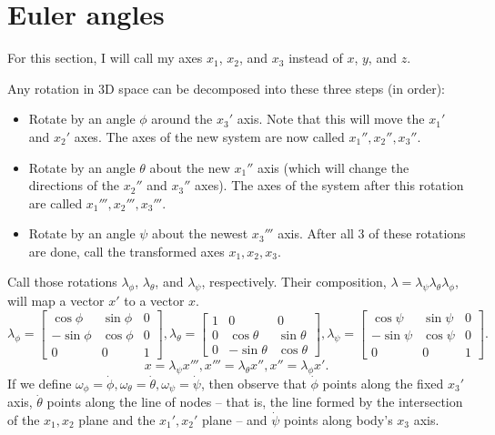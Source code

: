 \documentclass{article}
\begin{document}
\section{Euler angles}
For this section, I will call my axes $x_1$, $x_2$, and $x_3$ instead of $x$, $y$, and $z$.
\par
Any rotation in 3D space can be decomposed into these three steps (in order):
\begin{itemize}
    \item Rotate by an angle $\phi$ around the $x_3'$ axis. Note that this will move the $x_1'$ and $x_2'$ axes. The axes of the new system are now called $x_1'', x_2'', x_3''$.
    \item Rotate by an angle $\theta$ about the new $x_1''$ axis (which will change the directions of the $x_2''$ and $x_3''$ axes). The axes of the system after this rotation are called $x_1''', x_2''', x_3'''$.
    \item Rotate by an angle $\psi$ about the newest $x_3'''$ axis. After all 3 of these rotations are done, call the transformed axes $x_1, x_2, x_3$.
\end{itemize}
Call those rotations $\lambda_\phi$, $\lambda_\theta$, and $\lambda_\psi$, respectively. Their composition, $\lambda=\lambda_\psi \lambda_\theta \lambda_\phi$, will map a vector $x'$ to a vector $x$.
\[ \lambda_\phi = \begin{bmatrix}
    \cos \phi & \sin \phi & 0 \\
    -\sin \phi & \cos \phi & 0 \\
    0 & 0 & 1
\end{bmatrix}, \lambda_\theta = \begin{bmatrix}
    1 & 0 & 0 \\
    0 & \cos \theta & \sin \theta \\
    0 & -\sin \theta & \cos \theta
\end{bmatrix}, \lambda_\psi = \begin{bmatrix}
    \cos \psi & \sin \psi & 0 \\
    -\sin \psi & \cos \psi & 0 \\
    0 & 0 & 1
\end{bmatrix}. \]
\[ x = \lambda_\psi x''', x''' = \lambda_\theta x'', x'' = \lambda_\phi x'. \]
If we define $\omega_\phi = \dot{\phi}, \omega_\theta = \dot{\theta}, \omega_\psi=\dot{\psi}$, then observe that $\dot{\phi}$ points along the fixed $x_3'$ axis, $\dot{\theta}$ points along the line of nodes -- that is, the line formed by the intersection of the $x_1,x_2$ plane and the $x_1',x_2'$ plane -- and $\dot{\psi}$ points along body's $x_3$ axis.
\end{document}
